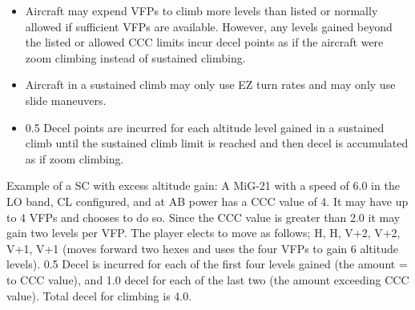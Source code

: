 \begin{itemize}
    \item{} Aircraft may expend VFPs to climb more levels than listed or normally allowed if sufficient VFPs are available. However, any levels gained beyond the listed or allowed CCC limits incur decel points as if the aircraft were zoom climbing instead of sustained climbing.

    \item{} Aircraft in a sustained climb may only use EZ turn rates  and may only use slide maneuvers.

    \item{} 0.5 Decel points are incurred for each altitude level gained in a sustained climb until the sustained climb limit is reached and then decel is accumulated as if zoom climbing. 



\end{itemize}

Example of a SC with excess altitude gain: A MiG-21 with a speed of 6.0 in the LO band, CL configured, and at AB power has a CCC value of 4. It may have up to 4 VFPs and chooses to do so. Since the CCC value is greater than 2.0 it may gain two levels per VFP. The player elects to move as follows; H, H, V+2, V+2, V+1, V+1 (moves forward two hexes and uses the four VFPs to gain 6 altitude levels). 0.5 Decel is incurred for each of the first four levels gained (the amount = to CCC value), and 1.0 decel for each of the last two (the amount exceeding CCC value). Total decel for climbing is 4.0.

